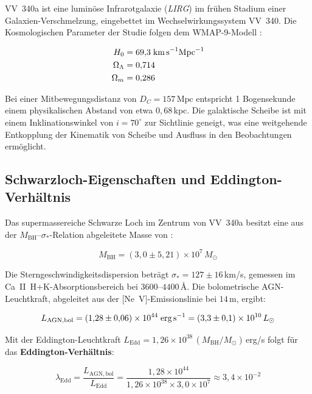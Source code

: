 ﻿\documentclass[12pt,a4paper]{report}
\begin{document}
VV~340a ist eine luminöse Infrarotgalaxie (\textit{LIRG}) im frühen Stadium einer Galaxien-Verschmelzung, eingebettet im Wechselwirkungssystem VV~340. Die Kosmologischen Parameter der Studie folgen dem WMAP-9-Modell \cite{kader2026}:

\begin{align}
	H_0 &= 69{,}3\;\text{km\,s}^{-1}\text{Mpc}^{-1} \\
	\Omega_\Lambda &= 0{,}714 \\
	\Omega_m &= 0{,}286
\end{align}

Bei einer Mitbewegungsdistanz von $D_C = 157\,\text{Mpc}$ entspricht 1 Bogensekunde einem physikalischen Abstand von etwa $0{,}68$\,kpc. Die galaktische Scheibe ist mit einem Inklinations\-winkel von $i = 70^\circ$ zur Sichtlinie geneigt, was eine weitgehende Entkopplung der Kinematik von Scheibe und Ausfluss in den Beobachtungen ermöglicht.

\subsection{Schwarzloch-Eigenschaften und Eddington-Verhältnis}

Das supermassereiche Schwarze Loch im Zentrum von VV~340a besitzt eine aus der $M_\mathrm{BH}$--$\sigma_*$-Relation abgeleitete Masse von \cite{kader2026}:

\begin{equation}
	\boxed{M_\mathrm{BH} = (3{,}0 \pm 5{,}21) \times 10^7\,M_\odot}
\end{equation}

Die Sterngeschwindigkeitsdispersion beträgt $\sigma_* = 127 \pm 16$\,km/s, gemessen im Ca~II~H+K-Absorptionsbereich bei $3600$--$4400$\,\AA. Die bolometrische AGN-Leuchtkraft, abgeleitet aus der [Ne~V]-Emissionslinie bei $14$\,\textmu m, ergibt:

\begin{equation}
	L_\mathrm{AGN,bol} = (1{,}28 \pm 0{,}06) \times 10^{44}\;\text{erg\,s}^{-1} = (3{,}3 \pm 0{,}1) \times 10^{10}\,L_\odot
\end{equation}

Mit der Eddington-Leuchtk\-raft $L_\mathrm{Edd} = 1{,}26 \times 10^{38}\,(M_\mathrm{BH}/M_\odot)$\,erg/s folgt für das \textbf{Eddington-Verhältnis}:

\begin{equation}
	\lambda_\mathrm{Edd} = \frac{L_\mathrm{AGN,bol}}{L_\mathrm{Edd}} = \frac{1{,}28 \times 10^{44}}{1{,}26 \times 10^{38} \times 3{,}0 \times 10^7} \approx 3{,}4 \times 10^{-2}
\end{equation}
\end{document}
